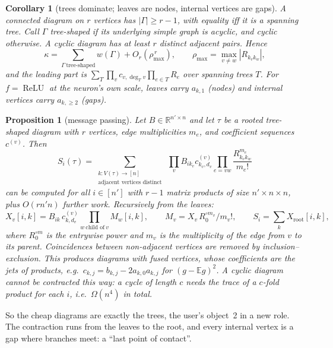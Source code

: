 \documentclass[11pt]{article}
\newtheorem{proposition}[theorem]{Proposition}
\newtheorem{corollary}[theorem]{Corollary}
\theoremstyle{definition}
\theoremstyle{remark}
\newcommand{\E}{\mathbb E}
\newcommand{\R}{\mathbb R}
\newcommand{\relu}{\operatorname{ReLU}}
\begin{document}
\begin{corollary}[trees dominate; leaves are nodes, internal vertices are gaps]\label{cor:trees}
A connected diagram on $r$ vertices has $|\Gamma|\ge r-1$, with equality iff it is a spanning tree. Call $\Gamma$ \emph{tree-shaped} if its underlying simple graph is acyclic, and \emph{cyclic} otherwise. A cyclic diagram has at least $r$ distinct adjacent pairs. Hence
\[
\kappa=\sum_{\Gamma\ \text{tree-shaped}}w(\Gamma)+O_r(\rho_{\max}^{\,r}),\qquad \rho_{\max}=\max_{v\ne w}|R_{k_vk_w}|,
\]
and the leading part is $\sum_{T}\prod_vc_{v,\deg_Tv}\prod_{e\in T}R_e$ over spanning trees $T$. For $f=\relu$ at the neuron's own scale, leaves carry $a_{k,1}$ (nodes) and internal vertices carry $a_{k,\ge2}$ (gaps).
\end{corollary}

\begin{proposition}[message passing]\label{prop:mp}
Let $B\in\R^{n'\times n}$ and let $\tau$ be a rooted tree-shaped diagram with $r$ vertices, edge multiplicities $m_e$, and coefficient sequences $c^{(v)}$. Then
\[
S_i(\tau)=\sum_{\substack{k:V(\tau)\to[n]\\ \text{adjacent vertices distinct}}}\ \prod_vB_{ik_v}c^{(v)}_{k_v,d_v}\prod_{e=vw}\frac{R_{k_vk_w}^{m_e}}{m_e!}
\]
can be computed for all $i\in[n']$ with $r-1$ matrix products of size $n'\times n\times n$, plus $O(rn'n)$ further work. Recursively from the leaves:
\[
X_v[i,k]=B_{ik}\,c^{(v)}_{k,d_v}\prod_{w\ \text{child of}\ v}M_w[i,k],\qquad M_v=X_v\,R_0^{\circ m_v}/m_v!,\qquad S_i=\sum_kX_{\mathrm{root}}[i,k],
\]
where $R_0^{\circ m}$ is the entrywise power and $m_v$ is the multiplicity of the edge from $v$ to its parent. Coincidences between non-adjacent vertices are removed by inclusion--exclusion. This produces diagrams with fused vertices, whose coefficients are the jets of products, e.g.\ $c_{k,j}=b_{k,j}-2a_{k,0}a_{k,j}$ for $(g-\E g)^2$. A cyclic diagram cannot be contracted this way: a cycle of length $c$ needs the trace of a $c$-fold product for each $i$, i.e.\ $\Omega(n^4)$ in total.
\end{proposition}

So the cheap diagrams are exactly the trees, the user's object~2 in a new role. The contraction runs from the leaves to the root, and every internal vertex is a gap where branches meet: a ``last point of contact''.
\end{document}
